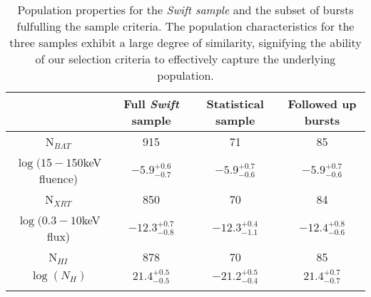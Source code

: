 \begin{table*}[!ht]

	\centering
	\begin{tabular}{cccc}
		\hline
		\hline\noalign{\smallskip}
		{} & {Full \textit{Swift} sample} & {Statistical sample} &  {Followed up bursts} \\
		\hline\noalign{\smallskip}
		N$_{BAT}$ & 915 & 71 & 85\\
		$\log(15-150$keV fluence)  & $-5.9_{-0.7}^{+0.6}$ &  $-5.9_{-0.6}^{+0.7}$ &  $-5.9_{-0.6}^{+0.7}$   \\
		N$_{XRT}$ & 850 & 70 & 84\\
		$\log(0.3-10$keV flux) & $-12.3_{-0.8}^{+0.7}$ &  $-12.3_{-1.1}^{+0.4}$ &  $-12.4_{-0.6}^{+0.8}$  \\
		N$_{HI}$ & 878 & 70 & 85\\
		$\log(N_H)$ & $21.4_{-0.5}^{+0.5}$ &  $-21.2_{-0.4}^{+0.5}$ &  $21.4_{-0.7}^{+0.7}$  \\
		
		\hline\noalign{\smallskip}
		
	\end{tabular}
	\caption{Population properties for the \textit{Swift sample} and the subset of bursts fulfulling the sample criteria. The population characteristics for the three samples exhibit a large degree of similarity, signifying the ability of our selection criteria to effectively capture the underlying population.  \label{tab:sample_properties}}
\end{table*}
